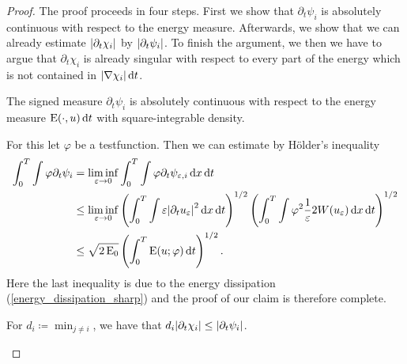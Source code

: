 \begin{proof}
	The proof proceeds in four steps. First we show that $ \partial_{ t } \psi_{ i } $ is absolutely continuous with respect to the energy measure. Afterwards, we show that we can already estimate $ \abs{ \partial_{ t } \chi_{ i } } $ by $ \abs{ \partial_{ t } \psi_{ i } } $. To finish the argument, we then we have to argue that $ \partial_{ t } \chi_{ i } $ is already singular with respect to every part of the energy which is not contained in $ \abs{ \nabla \chi_{ i } } \dd{ t } $.
	 
	\begin{description}[wide=0pt]
		\item[Step 1:] The signed measure $ \partial_{  t } \psi_{ i } $ is absolutely continuous with respect to the energy measure $ \operatorname{E} ( \cdot, u ) \dd{t } $ with square-integrable density.
		
		For this let $ \varphi $ be a testfunction. Then we can estimate by Hölder's inequality
		\begin{align*}
			\int_{ 0 }^{ T }
				\int
					\varphi
					\partial_{ t } \psi_{ i }
			& =
			\liminf_{ \varepsilon \to 0 }
				\int_{ 0 }^{ T }
					\int
						\varphi
						\partial_{ t } \psi_{ \varepsilon ,i }
					\dd{ x }
				\dd{ t }
			\\
			& \leq
			\liminf_{ \varepsilon \to 0 }
				\left(
					\int_{ 0 }^{ T }
						\int
							\varepsilon 
							\abs{ \partial_{ t } u_{ \varepsilon } }^{ 2 }
						\dd{ x }
					\dd{ t }
				\right)^{ 1/2 }
				\left(
					\int_{ 0 }^{ T }
						\int
							\varphi^{ 2 }
							\frac{ 1 }{ \varepsilon }
							2 W ( u_{ \varepsilon } )
						\dd{ x }
					\dd{ t }
				\right)^{ 1/2 }
			\\
			& \leq
			\sqrt{ 2 \operatorname{E}_{ 0 } }
			\left(
				\int_{ 0 }^{ T }
					\operatorname{E} ( u ; \varphi )
				\dd{ t }
			\right)^{ 1/2 }.
		\end{align*}
		Here the last inequality is due to the energy dissipation (\ref{energy_dissipation_sharp})
		and the proof of our claim is therefore complete.
		
		\item[Step 2:] For $ d_{ i } \coloneqq \min_{ j \neq i } $, we have that $ d_{ i } \abs{ \partial_{ t } \chi_{ i } } \leq \abs{ \partial_{ t } \psi_{ i } } $.
		

\end{description}
\end{proof}
